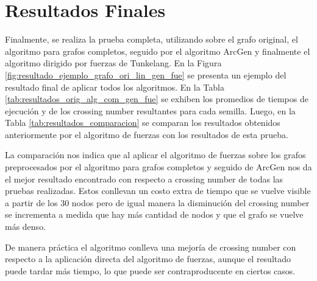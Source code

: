 \section{Resultados Finales}
\label{sec:resultados_finales}
Finalmente, se realiza la prueba completa, utilizando sobre el grafo original, el algoritmo para grafos completos, seguido por el algoritmo ArcGen y finalmente el algoritmo dirigido por fuerzas de Tunkelang. En la Figura \ref{fig:resultado_ejemplo_grafo_ori_lin_gen_fue} se presenta un ejemplo del resultado final de aplicar todos los algoritmos. En la Tabla \ref{tab:resultados_orig_alg_com_gen_fue} se exhiben los promedios de tiempos de ejecución y de los crossing number resultantes para cada semilla. Luego, en la Tabla \ref{tab:resultados_comparacion} se comparan los resultados obtenidos anteriormente por el algoritmo de fuerzas con los resultados de esta prueba.



La comparación nos indica que al aplicar el algoritmo de fuerzas sobre los grafos preprocesados por el algoritmo para grafos completos y seguido de ArcGen nos da el mejor resultado encontrado con respecto a crossing number de todas las pruebas realizadas. Estos conllevan un costo extra de tiempo que se vuelve visible a partir de los 30 nodos pero de igual manera la disminución del crossing number se incrementa a medida que hay más cantidad de nodos y que el grafo se vuelve más denso.

De manera práctica el algoritmo conlleva una mejoría de crossing number con respecto a la aplicación directa del algoritmo de fuerzas, aunque el resultado puede tardar más tiempo, lo que puede ser contraproducente en ciertos casos.